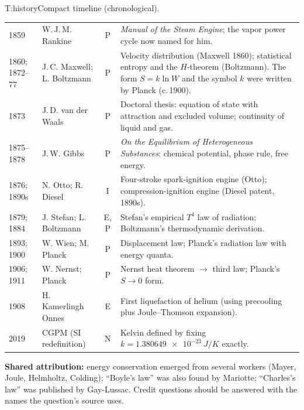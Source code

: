 \begin{reftab}{T:history}{Compact timeline (chronological).}
\begin{tabularx}{\textwidth}{@{}lL{0.21\textwidth}cY@{}}
1859 & W.\,J.\,M. Rankine & P & \emph{Manual of the Steam Engine}; the vapor power cycle now named for him.\\
1860; 1872--77 & J.\,C. Maxwell; L. Boltzmann & P & Velocity distribution (Maxwell 1860); statistical entropy and the $H$-theorem (Boltzmann). The form $S=k\ln W$ and the symbol $k$ were written by Planck (c.\,1900).\\
1873 & J.\,D. van der Waals & P & Doctoral thesis: equation of state with attraction and excluded volume; continuity of liquid and gas.\\
1875--1878 & J.\,W. Gibbs & P & \emph{On the Equilibrium of Heterogeneous Substances}: chemical potential, phase rule, free energy.\\
1876; 1890s & N. Otto; R. Diesel & I & Four-stroke spark-ignition engine (Otto); compression-ignition engine (Diesel patent, 1890s).\\
1879; 1884 & J. Stefan; L. Boltzmann & E, P & Stefan's empirical $T^4$ law of radiation; Boltzmann's thermodynamic derivation.\\
1893; 1900 & W. Wien; M. Planck & P & Displacement law; Planck's radiation law with energy quanta.\\
1906; 1911 & W. Nernst; Planck & P & Nernst heat theorem $\to$ third law; Planck's $S\to0$ form.\\
1908 & H. Kamerlingh Onnes & E & First liquefaction of helium (using precooling plus Joule--Thomson expansion).\\
2019 & CGPM (SI redefinition) & N & Kelvin defined by fixing $k=\SI{1.380649e-23}{J/K}$ exactly.\\
\bottomrule
\end{tabularx}\end{reftab}
\textbf{Shared attribution:} energy conservation emerged from several workers (Mayer, Joule, Helmholtz, Colding); ``Boyle's law'' was also found by Mariotte; ``Charles's law'' was published by Gay-Lussac. Credit questions should be answered with the names the question's source uses.
